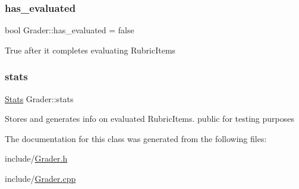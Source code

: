\subsubsection{\texorpdfstring{has\+\_\+evaluated}{has\_evaluated}}
{\footnotesize\ttfamily bool Grader\+::has\+\_\+evaluated = false}

True after it completes evaluating Rubric\+Items \hypertarget{class_grader_aaa7a08227037ccd8b20d02d372fe567f}{}\label{class_grader_aaa7a08227037ccd8b20d02d372fe567f} 
\subsubsection{\texorpdfstring{stats}{stats}}
{\footnotesize\ttfamily \hyperlink{class_stats}{Stats} Grader\+::stats}

Stores and generates info on evaluated Rubric\+Items. public for testing purposes 

The documentation for this class was generated from the following files\+:\begin{DoxyCompactItemize}
\item 
include/\hyperlink{_grader_8h}{Grader.\+h}\item 
include/\hyperlink{_grader_8cpp}{Grader.\+cpp}\end{DoxyCompactItemize}
